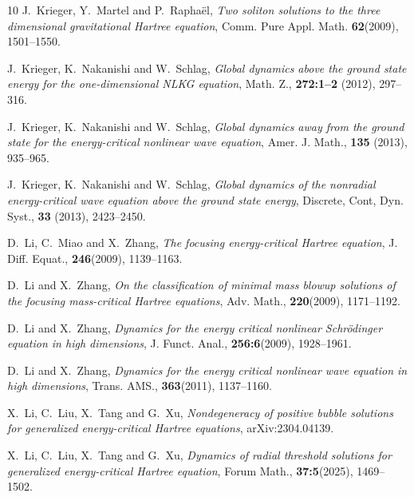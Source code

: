 \documentclass[reqno, 11pt]{amsart}
\numberwithin{equation}{section}
\theoremstyle{plain}
\theoremstyle{definition}
\numberwithin{equation}{section}
\numberwithin{theorem}{section}
\numberwithin{equation}{section}
\numberwithin{equation}{section}
\numberwithin{theorem}{section}
\begin{document}
\begin{thebibliography}{10}
		 J.~Krieger, Y.~Martel and P.~Rapha\"{e}l, \emph{Two soliton solutions to the three dimensional gravitational Hartree equation}, Comm. Pure Appl. Math. \textbf{62}(2009), 1501--1550.
		
		J.~Krieger, K.~Nakanishi and W.~Schlag, \emph{Global dynamics above the ground state energy for the one-dimensional NLKG equation}, Math. Z., \textbf{272:1--2} (2012), 297--316.
		
		J.~Krieger, K.~Nakanishi and W.~Schlag, \emph{Global dynamics away from the ground state for the energy-critical nonlinear wave equation}, Amer. J. Math., \textbf{135} (2013), 935--965.
		
		J.~Krieger, K.~Nakanishi and W.~Schlag, \emph{Global dynamics of the nonradial energy-critical wave equation above the ground state energy}, Discrete, Cont, Dyn. Syst., \textbf{33} (2013), 2423--2450.
		
		
		D.~Li, C.~Miao and X.~Zhang, \emph{The focusing energy-critical Hartree equation}, J. Diff. Equat., \textbf{246}(2009), 1139--1163.
		
		D.~Li and X.~Zhang, \emph{On the classification of minimal mass blowup solutions of the focusing mass-critical Hartree equations}, Adv. Math., \textbf{220}(2009), 1171--1192.
		
		D.~Li and X.~Zhang, \emph{Dynamics for the energy critical nonlinear Schr\"{o}dinger equation in high
			dimensions}, J. Funct. Anal., \textbf{256:6}(2009), 1928--1961.
		
		D.~Li and X.~Zhang, \emph{Dynamics for the energy critical nonlinear wave equation in high
			dimensions}, Trans. AMS., \textbf{363}(2011), 1137--1160.
		
		
		X.~Li, C.~Liu, X.~Tang and G.~Xu,  \emph{Nondegeneracy of positive bubble solutions for generalized energy-critical Hartree equations}, arXiv:2304.04139.
		
		X.~Li, C.~Liu, X.~Tang and G.~Xu, \emph{Dynamics of radial threshold solutions for generalized energy-critical Hartree equation}, Forum Math., \textbf{37:5}(2025), 1469--1502. 
			

\end{thebibliography}
\end{document}
